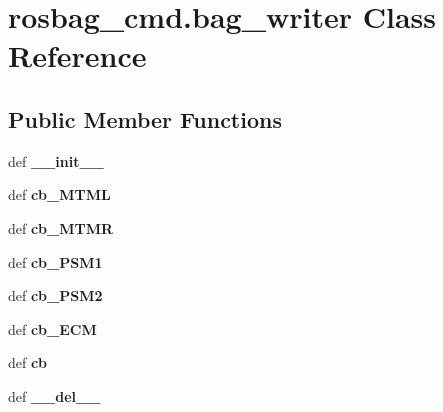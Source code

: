 \hypertarget{classrosbag__cmd_1_1bag__writer}{\section{rosbag\-\_\-cmd.\-bag\-\_\-writer Class Reference}
\label{classrosbag__cmd_1_1bag__writer}
}
\subsection*{Public Member Functions}
\begin{DoxyCompactItemize}
\item 
\hypertarget{classrosbag__cmd_1_1bag__writer_a2ad2578981ae6aa7acd2f07c7e816e1e}{def {\bfseries \-\_\-\-\_\-init\-\_\-\-\_\-}}\label{classrosbag__cmd_1_1bag__writer_a2ad2578981ae6aa7acd2f07c7e816e1e}

\item 
\hypertarget{classrosbag__cmd_1_1bag__writer_ac2259d72d60ddd8471f368fc6feda02d}{def {\bfseries cb\-\_\-\-M\-T\-M\-L}}\label{classrosbag__cmd_1_1bag__writer_ac2259d72d60ddd8471f368fc6feda02d}

\item 
\hypertarget{classrosbag__cmd_1_1bag__writer_a25a2dcf2f73621831a4ce4a0890a6564}{def {\bfseries cb\-\_\-\-M\-T\-M\-R}}\label{classrosbag__cmd_1_1bag__writer_a25a2dcf2f73621831a4ce4a0890a6564}

\item 
\hypertarget{classrosbag__cmd_1_1bag__writer_a9947164d307f820f470064fb80a01d6c}{def {\bfseries cb\-\_\-\-P\-S\-M1}}\label{classrosbag__cmd_1_1bag__writer_a9947164d307f820f470064fb80a01d6c}

\item 
\hypertarget{classrosbag__cmd_1_1bag__writer_ac1bf8bafa4fd9d3b9f0c4f48ceb297a4}{def {\bfseries cb\-\_\-\-P\-S\-M2}}\label{classrosbag__cmd_1_1bag__writer_ac1bf8bafa4fd9d3b9f0c4f48ceb297a4}

\item 
\hypertarget{classrosbag__cmd_1_1bag__writer_ac0d1936d15ee5a8879c6af4c7a96ae18}{def {\bfseries cb\-\_\-\-E\-C\-M}}\label{classrosbag__cmd_1_1bag__writer_ac0d1936d15ee5a8879c6af4c7a96ae18}

\item 
\hypertarget{classrosbag__cmd_1_1bag__writer_a9535a08e9c5ac9f5bce13689c071c259}{def {\bfseries cb}}\label{classrosbag__cmd_1_1bag__writer_a9535a08e9c5ac9f5bce13689c071c259}

\item 
\hypertarget{classrosbag__cmd_1_1bag__writer_aaf2c857540bad83d48a7dda2b9ba31a4}{def {\bfseries \-\_\-\-\_\-del\-\_\-\-\_\-}}\label{classrosbag__cmd_1_1bag__writer_aaf2c857540bad83d48a7dda2b9ba31a4}

\end{DoxyCompactItemize}
